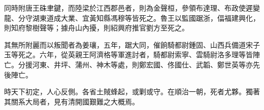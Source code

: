 \begin{pinyinscope}
同時附唐王硃聿鍵，而陸梁於江西郡邑者，則為金聲桓，參領布達理、布政使遲變龍、分守湖東道成大業、宜黃知縣馮穆等皆死之。魯王以監國踞浙，偪福建興化，則知府黎樹聲等；據舟山內擾，則紹興府推官劉方至死之。

其無所附麗而以叛聞者為姜瓖，五年，踞大同，催餉騎都尉鍾固、山西兵備道宋子玉等死之。六年，從英親王阿濟格等軍進討者，騎都尉索寧、雲騎尉洛多理等皆陣亡。分援河東、井坪、蒲州、神木等處，則鄭宏國、佟國仕、武韜、鄭世英等亦先後陣亡。

時天下初定，人心反側。各省土賊蜂起，或剿或守。在順治一朝，死者尤夥。獨著其關系大局者，見有清開國艱難之大概焉。


\end{pinyinscope}